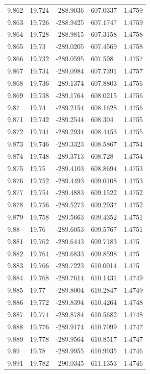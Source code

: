 \begin{tabular}{lllll}
9.862 & 19.724 & -288.9036 & 607.0337 & 1.4759 \\
9.863 & 19.726 & -288.9425 & 607.1747 & 1.4759 \\
9.864 & 19.728 & -288.9815 & 607.3158 & 1.4758 \\
9.865 & 19.73 & -289.0205 & 607.4569 & 1.4758 \\
9.866 & 19.732 & -289.0595 & 607.598 & 1.4757 \\
9.867 & 19.734 & -289.0984 & 607.7391 & 1.4757 \\
9.868 & 19.736 & -289.1374 & 607.8803 & 1.4756 \\
9.869 & 19.738 & -289.1764 & 608.0215 & 1.4756 \\
9.87 & 19.74 & -289.2154 & 608.1628 & 1.4756 \\
9.871 & 19.742 & -289.2544 & 608.304 & 1.4755 \\
9.872 & 19.744 & -289.2934 & 608.4453 & 1.4755 \\
9.873 & 19.746 & -289.3323 & 608.5867 & 1.4754 \\
9.874 & 19.748 & -289.3713 & 608.728 & 1.4754 \\
9.875 & 19.75 & -289.4103 & 608.8694 & 1.4753 \\
9.876 & 19.752 & -289.4493 & 609.0108 & 1.4753 \\
9.877 & 19.754 & -289.4883 & 609.1522 & 1.4752 \\
9.878 & 19.756 & -289.5273 & 609.2937 & 1.4752 \\
9.879 & 19.758 & -289.5663 & 609.4352 & 1.4751 \\
9.88 & 19.76 & -289.6053 & 609.5767 & 1.4751 \\
9.881 & 19.762 & -289.6443 & 609.7183 & 1.475 \\
9.882 & 19.764 & -289.6833 & 609.8598 & 1.475 \\
9.883 & 19.766 & -289.7223 & 610.0014 & 1.475 \\
9.884 & 19.768 & -289.7614 & 610.1431 & 1.4749 \\
9.885 & 19.77 & -289.8004 & 610.2847 & 1.4749 \\
9.886 & 19.772 & -289.8394 & 610.4264 & 1.4748 \\
9.887 & 19.774 & -289.8784 & 610.5682 & 1.4748 \\
9.888 & 19.776 & -289.9174 & 610.7099 & 1.4747 \\
9.889 & 19.778 & -289.9564 & 610.8517 & 1.4747 \\
9.89 & 19.78 & -289.9955 & 610.9935 & 1.4746 \\
9.891 & 19.782 & -290.0345 & 611.1353 & 1.4746 \\

\end{tabular}
